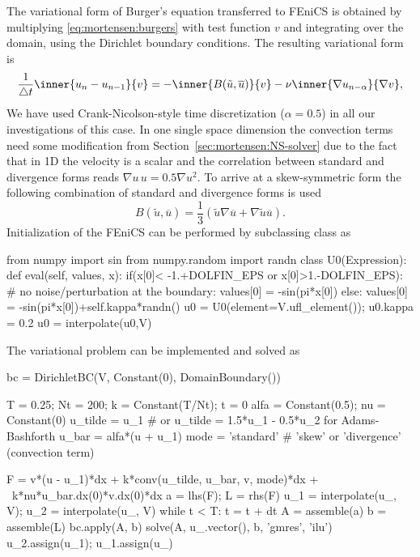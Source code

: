 The variational form of Burger's equation transferred to FEniCS is
obtained by multiplying \eqref{eq:mortensen:burgers} with test
function $v$ and integrating over the domain, using the Dirichlet
boundary conditions. The resulting variational form is
\begin{equation}
 \frac{1}{\triangle t}\inner{ u_{n} - u_{n-1}}{v} = - \inner{B(\tilde{u},\overline{u})}{ v } - \nu \inner{ \nabla u_{n-\alpha}}{\nabla v },
\label{eq:mortensen:burgers_vf}
\end{equation}
We have used Crank-Nicolson-style time discretization ($\alpha=0.5$)
in all our investigations of this case. In one single space dimension
the convection terms need some modification from
Section~\ref{sec:mortensen:NS-solver} due to the fact that in 1D the
velocity is a scalar and the correlation between standard and
divergence forms reads $\nabla u \, u =0.5 \nabla u^2$. To arrive at a
skew-symmetric form the following combination of standard and
divergence forms is used
\begin{equation}
 B(\tilde{u},\overline{u}) = \frac{1}{3}\left( \tilde{u}\nabla \overline{u} + \nabla \tilde{u} \overline{u} \right).
\end{equation}
Initialization of the FEniCS
 can be performed by subclassing  class
 as
\begin{python}
from numpy import sin
from numpy.random import randn
class U0(Expression):
    def eval(self, values, x):
        if(x[0]< -1.+DOLFIN_EPS or x[0]>1.-DOLFIN_EPS):
            # no noise/perturbation at the boundary:
            values[0] = -sin(pi*x[0])
        else:
            values[0] = -sin(pi*x[0])+self.kappa*randn()
u0 = U0(element=V.ufl_element()); u0.kappa = 0.2
u0 = interpolate(u0,V)
\end{python}
The variational problem can be implemented and solved as
\begin{python}
bc = DirichletBC(V, Constant(0), DomainBoundary())

T = 0.25; Nt = 200; k = Constant(T/Nt); t = 0
alfa = Constant(0.5); nu = Constant(0)
u_tilde = u_1 # or u_tilde = 1.5*u_1 - 0.5*u_2 for Adams-Bashforth
u_bar = alfa*(u + u_1)
mode = 'standard'  # 'skew' or 'divergence' (convection term)

F = v*(u - u_1)*dx + k*conv(u_tilde, u_bar, v, mode)*dx + \
    k*nu*u_bar.dx(0)*v.dx(0)*dx
a = lhs(F); L = rhs(F)
u_1 = interpolate(u_, V); u_2 = interpolate(u_, V)
while t < T:
    t = t + dt
    A = assemble(a)
    b = assemble(L)
    bc.apply(A, b)
    solve(A, u_.vector(), b, 'gmres', 'ilu')
    u_2.assign(u_1); u_1.assign(u_)
\end{python}


